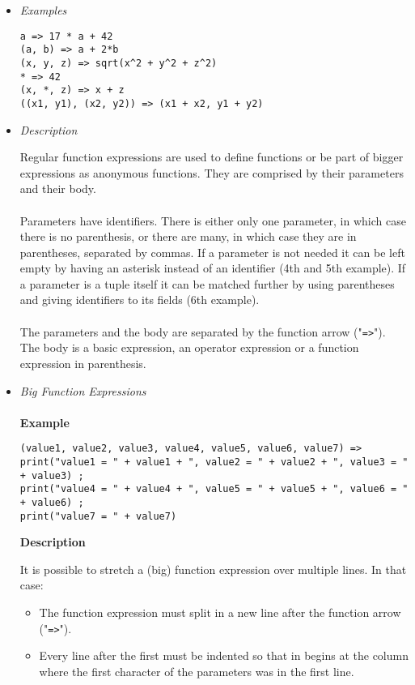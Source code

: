 \documentclass[diploma]{softlab-thesis}
\begin{document}
\begin{itemize}
\item \textit{Examples}

\begin{verbatim}
a => 17 * a + 42
(a, b) => a + 2*b
(x, y, z) => sqrt(x^2 + y^2 + z^2)
* => 42
(x, *, z) => x + z
((x1, y1), (x2, y2)) => (x1 + x2, y1 + y2)
\end{verbatim}

\item \textit{Description}

Regular function expressions are used to define functions or be part of bigger
expressions as anonymous functions. They are comprised by their parameters and
their body.
\\\\
Parameters have identifiers. There is either only one parameter, in which case
there is no parenthesis, or there are many, in which case they are in
parentheses, separated by commas. If a parameter is not needed it can be left
empty by having an asterisk instead of an identifier (4th and 5th example).
If a parameter is a tuple itself it can be matched further by using parentheses
and giving identifiers to its fields (6th example).
\\\\
The parameters and the body are separated by the function arrow
("\verb|=>|"). The body is a basic expression, an operator expression or
a function expression in parenthesis.

\item \textit{Big Function Expressions}\\\\
\textbf{Example}

\begin{verbatim}
(value1, value2, value3, value4, value5, value6, value7) =>
print("value1 = " + value1 + ", value2 = " + value2 + ", value3 = " + value3) ;
print("value4 = " + value4 + ", value5 = " + value5 + ", value6 = " + value6) ;
print("value7 = " + value7)
\end{verbatim}

\textbf{Description}

It is possible to stretch a (big) function expression over multiple lines.
In that case:
\begin{itemize}
\item
The function expression must split in a new line after the function arrow
("\verb|=>|").

\item
Every line after the first must be indented so that in begins at the column
where the first character of the parameters was in the first line.


\end{itemize}
\end{itemize}
\end{document}
